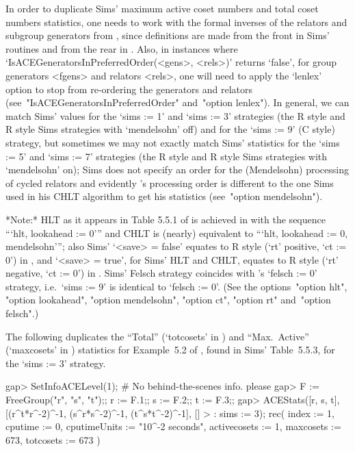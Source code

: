 In order to duplicate Sims' maximum active  coset  numbers  and  total
coset numbers statistics, one needs to work with the  formal  inverses
of the relators  and  subgroup  generators  from  \cite{Sim94},  since
definitions are made from the front in Sims'  routines  and  from  the
rear      in      {\ACE}.      Also,      in      instances      where
`IsACEGeneratorsInPreferredOrder(<gens>, <rels>)' returns `false', for
group generators <fgens> and relators <rels>, one will need  to  apply
the `lenlex' option to stop {\ACE} from re-ordering the generators and
relators (see~"IsACEGeneratorsInPreferredOrder" and~"option  lenlex").
In general, we can match Sims' values for the `sims := 1' and `sims :=
3' strategies  (the  R  style  and  R\*  style  Sims  strategies  with
`mendelsohn' off) and for the `sims :=  9'  (C  style)  strategy,  but
sometimes we may not exactly match Sims' statistics for the  `sims  :=
5' and `sims :=  7'  strategies  (the  R  style  and  R\*  style  Sims
strategies with `mendelsohn' on); Sims does not specify an  order  for
the (Mendelsohn) processing of cycled relators and evidently  {\ACE}'s
processing order is different  to  the  one  Sims  used  in  his  CHLT
algorithm to get his statistics (see~"option mendelsohn").

*Note:* 
HLT as it appears in Table 5.5.1 of \cite{Sim94} is achieved in {\ACE}
with the sequence ```hlt, lookahead  :=  0'''  and  CHLT  is  (nearly)
equivalent to  ```hlt,  lookahead  :=  0,  mendelsohn''';  also  Sims'
`<save> = false' equates to R style (`rt'  positive,  `ct  :=  0')  in
{\ACE}, and `<save> = true', for Sims' HLT and CHLT,  equates  to  R\*
style (`rt' negative, `ct := 0')  in  {\ACE}.  Sims'  Felsch  strategy
coincides with {\ACE}'s `felsch := 0' strategy, i.e.~`sims  :=  9'  is
identical to `felsch := 0'. (See  the  options~"option  hlt",  "option
lookahead", "option mendelsohn", "option ct", "option rt"  and~"option
felsch".)

The following duplicates the ``Total''  (`totcosets'  in  {\ACE})  and
``Max.~Active'' (`maxcosets' in {\ACE}) statistics for Example~5.2  of
\cite{Sim94},  found  in  Sims'  Table~5.5.3,  for  the  `sims  :=  3'
strategy.

\beginexample
gap> SetInfoACELevel(1); # No behind-the-scenes info. please
gap> F := FreeGroup("r", "s", "t");; r := F.1;; s := F.2;; t := F.3;;
gap> ACEStats([r, s, t], [(r^t*r^-2)^-1, (s^r*s^-2)^-1, (t^s*t^-2)^-1], []
>             : sims := 3);
rec( index := 1, cputime := 0, cputimeUnits := "10^-2 seconds", 
  activecosets := 1, maxcosets := 673, totcosets := 673 )
\endexample

